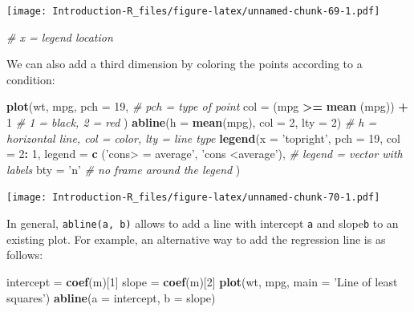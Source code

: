 \documentclass[]{book}
\newenvironment{Shaded}{\begin{snugshade}}{\end{snugshade}}
\newcommand{\CommentTok}[1]{\textcolor[rgb]{0.56,0.35,0.01}{\textit{#1}}}
\newcommand{\DataTypeTok}[1]{\textcolor[rgb]{0.13,0.29,0.53}{#1}}
\newcommand{\DecValTok}[1]{\textcolor[rgb]{0.00,0.00,0.81}{#1}}
\newcommand{\KeywordTok}[1]{\textcolor[rgb]{0.13,0.29,0.53}{\textbf{#1}}}
\newcommand{\NormalTok}[1]{#1}
\newcommand{\OperatorTok}[1]{\textcolor[rgb]{0.81,0.36,0.00}{\textbf{#1}}}
\newcommand{\StringTok}[1]{\textcolor[rgb]{0.31,0.60,0.02}{#1}}
\begin{document}
\texttt{[image: Introduction-R\_files/figure-latex/unnamed-chunk-69-1.pdf]}

\begin{Shaded}
\begin{Highlighting}[]
\CommentTok{# x = legend location}
\end{Highlighting}
\end{Shaded}

We can also add a third dimension by coloring the points according to a condition:

\begin{Shaded}
\begin{Highlighting}[]
\KeywordTok{plot}\NormalTok{(wt, mpg,}
     \DataTypeTok{pch =} \DecValTok{19}\NormalTok{, }\CommentTok{# pch = type of point}
     \DataTypeTok{col =}\NormalTok{ (mpg }\OperatorTok{>=}\StringTok{ }\KeywordTok{mean}\NormalTok{ (mpg)) }\OperatorTok{+}\StringTok{ }\DecValTok{1} \CommentTok{# 1 = black, 2 = red}
\NormalTok{)}
\KeywordTok{abline}\NormalTok{(}\DataTypeTok{h =} \KeywordTok{mean}\NormalTok{(mpg), }\DataTypeTok{col =} \DecValTok{2}\NormalTok{, }\DataTypeTok{lty =} \DecValTok{2}\NormalTok{) }\CommentTok{# h = horizontal line, col = color, lty = line type}
\KeywordTok{legend}\NormalTok{(}\DataTypeTok{x =} \StringTok{'topright'}\NormalTok{,}
       \DataTypeTok{pch =} \DecValTok{19}\NormalTok{,}
       \DataTypeTok{col =} \DecValTok{2}\OperatorTok{:}\StringTok{ }\DecValTok{1}\NormalTok{,}
       \DataTypeTok{legend =} \KeywordTok{c}\NormalTok{ (}\StringTok{'cons> = average'}\NormalTok{, }\StringTok{'cons <average'}\NormalTok{), }\CommentTok{# legend = vector with labels}
       \DataTypeTok{bty =} \StringTok{'n'} \CommentTok{# no frame around the legend}
\NormalTok{)}
\end{Highlighting}
\end{Shaded}

\texttt{[image: Introduction-R\_files/figure-latex/unnamed-chunk-70-1.pdf]}

In general, \texttt{abline(a,\ b)} allows to add a line with intercept \texttt{a} and slope\texttt{b} to an existing plot. For example, an alternative way to add the regression line is as follows:

\begin{Shaded}
\begin{Highlighting}[]
\NormalTok{intercept =}\StringTok{ }\KeywordTok{coef}\NormalTok{(m)[}\DecValTok{1}\NormalTok{]}
\NormalTok{slope =}\StringTok{ }\KeywordTok{coef}\NormalTok{(m)[}\DecValTok{2}\NormalTok{]}
\KeywordTok{plot}\NormalTok{(wt, mpg, }\DataTypeTok{main =} \StringTok{'Line of least squares'}\NormalTok{)}
\KeywordTok{abline}\NormalTok{(}\DataTypeTok{a =}\NormalTok{ intercept, }\DataTypeTok{b =}\NormalTok{ slope)}
\end{Highlighting}
\end{Shaded}
\end{document}
